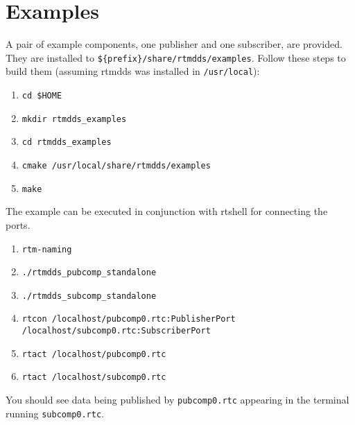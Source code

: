 \documentclass[a4paper,10pt]{article}
\newcommand{\ilcode}[1]{\lstinline|#1|}
\begin{document}
\section{Examples}
\label{sec:examples}

A pair of example components, one publisher and one subscriber, are
provided. They are installed to \ilcode{${prefix}/share/rtmdds/examples}.
Follow these steps to build them (assuming rtmdds was installed in
\ilcode{/usr/local}):

\begin{enumerate}
  \item \ilcode{cd $HOME}
  \item \ilcode{mkdir rtmdds_examples}
  \item \ilcode{cd rtmdds_examples}
  \item \ilcode{cmake /usr/local/share/rtmdds/examples}
  \item \ilcode{make}
\end{enumerate}

The example can be executed in conjunction with rtshell for connecting
the ports.

\begin{enumerate}
  \item \ilcode{rtm-naming}
  \item \ilcode{./rtmdds_pubcomp_standalone}
  \item \ilcode{./rtmdds_subcomp_standalone}
  \item \ilcode{rtcon /localhost/pubcomp0.rtc:PublisherPort
  /localhost/subcomp0.rtc:SubscriberPort}
  \item \ilcode{rtact /localhost/pubcomp0.rtc}
  \item \ilcode{rtact /localhost/subcomp0.rtc}
\end{enumerate}

You should see data being published by \ilcode{pubcomp0.rtc} appearing in
the terminal running \ilcode{subcomp0.rtc}.

\end{document}
